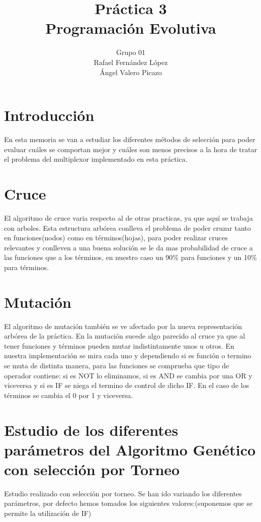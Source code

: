 \documentclass[12pt]{article}
\title{Práctica 3\\Programación Evolutiva}
\author{Grupo 01\\Rafael Fernández López\\Ángel Valero Picazo}
\date{}
\begin{document}
\maketitle
\newpage
\newpage
\tableofcontents
\newpage

\section{Introducción}

	En esta memoria se van a estudiar los diferentes métodos de selección para poder
    evaluar cuáles se comportan mejor y cuáles son menos precisos a la hora de tratar el problema del
    multiplexor implementado en esta práctica.


\section{Cruce}

	El algoritmo de cruce varia respecto al de otras practicas, ya que aquí se trabaja con arboles. Esta estructura arbórea conlleva el problema de poder cruzar tanto en funciones(nodos) como en términos(hojas), para poder realizar cruces relevantes y conlleven a una buena solución se le da mas probabilidad de cruce a las funciones que a los términos, en nuestro caso un 90\% para funciones y un 10\% para términos. 

\section{Mutación}

	El algoritmo de mutación también se ve afectado por la nueva representación arbórea de la práctica. En la mutación sucede algo parecido al cruce ya que al tener funciones y términos pueden mutar indistintamente unos u otros. En nuestra implementación se mira cada uno y dependiendo si es función o termino se muta de distinta manera, para las funciones se comprueba que tipo de operador contiene: si es NOT lo eliminamos, si es AND se cambia por una OR y viceversa y si es IF se niega el termino de control de dicho IF. En el caso de los términos se cambia el 0 por 1 y viceversa.

\section{Estudio de los diferentes parámetros del Algoritmo Genético con selección por Torneo}

	Estudio realizado con selección por torneo. Se han ido variando los diferentes parámetros, por defecto hemos tomados los siguientes valores:(suponemos que se permite la utilización de IF)
\end{document}
